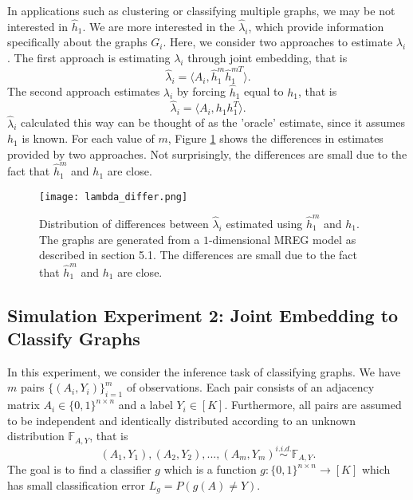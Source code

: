 \documentclass[10pt,journal,compsoc]{IEEEtran}
\begin{document}
\noindent In applications such as clustering or classifying multiple graphs, we may be not interested in $\hat{h}_1$. We are more interested in the $\hat{\lambda}_i$, which provide information specifically about the graphs $G_i$. Here, we consider two approaches to estimate $\lambda_i$. The first approach is estimating $\lambda_i$ through joint embedding, that is
\[ \hat{\lambda}_i = \langle A_i,  \hat{h}^m_1 \hat{h}^{m T}_1 \rangle. \]
The second approach estimates $\lambda_i$ by forcing $\hat{h}_1$ equal to $h_1$, that is 
\[ \hat{\lambda}_i = \langle A_i,  h_1 h_1^T \rangle. \]
$\hat{\lambda}_i$ calculated this way can be thought of as the 'oracle' estimate, since it assumes $h_1$ is known. For each value of $m$, Figure \ref{fig:ld} shows the differences in estimates provided by two approaches. Not surprisingly, the differences are small due to the fact that $\hat{h}_1^m$ and $h_1$ are close.
\begin{figure}[!htbp]
	\centering
	\texttt{[image: lambda\_differ.png]}
	\caption{Distribution of differences between $\hat{\lambda}_i$ estimated using $\hat{h}_1^m$ and $h_1$. The graphs are generated from a $1$-dimensional MREG model as described in section 5.1. The differences are small due to the fact that $\hat{h}_1^m$ and $h_1$ are close.}
	\label{fig:ld}
\end{figure}

\subsection{Simulation Experiment 2: Joint Embedding to Classify Graphs}
In this experiment, we consider the inference task of classifying graphs.  We have $m$ pairs $\{(A_i,Y_i)\}_{i=1}^{m}$ of observations. Each pair consists of an adjacency matrix $A_i \in \{0,1\}^{n \times n}$ and a label $Y_i \in [K]$. Furthermore, all pairs are assumed to be independent and identically distributed according to an unknown distribution $\mathbb{F}_{A,Y}$, that is
\[(A_1,Y_1),(A_2,Y_2),...,(A_m,Y_m) \overset{i.i.d.}{\sim} \mathbb{F}_{A,Y}. \] 
The goal is to find a classifier $g$ which is a function $g:\{0,1\}^{n \times n} \rightarrow [K]$ which has small classification error $L_g=P(g(A)\neq Y)$. \\ 
\end{document}
